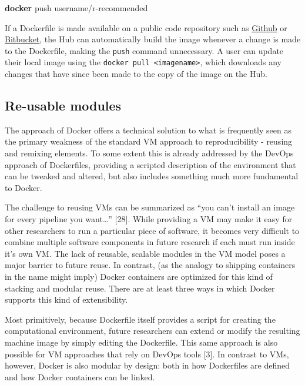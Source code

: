 \documentclass[9pt]{components/acm_proc_article-sp}
\newenvironment{Shaded}{\begin{snugshade}}{\end{snugshade}}
\newcommand{\KeywordTok}[1]{\textcolor[rgb]{0.13,0.29,0.53}{\textbf{{#1}}}}
\newcommand{\NormalTok}[1]{{#1}}
\begin{document}
\begin{Shaded}
\begin{Highlighting}[]
\KeywordTok{docker} \NormalTok{push username/r-recommended}
\end{Highlighting}
\end{Shaded}

If a Dockerfile is made available on a public code repository such as
\href{https://github.com}{Github} or
\href{https://bitbucket.org}{Bitbucket}, the Hub can automatically build
the image whenever a change is made to the Dockerfile, making the
\texttt{push} command unnecessary. A user can update their local image
using the \texttt{docker pull \textless{}imagename\textgreater{}}, which
downloads any changes that have since been made to the copy of the image
on the Hub.

\subsection{Re-usable modules}\label{re-usable-modules}

The approach of Docker offers a technical solution to what is frequently
seen as the primary weakness of the standard VM approach to
reproducibility - reusing and remixing elements. To some extent this is
already addressed by the DevOps approach of Dockerfiles, providing a
scripted description of the environment that can be tweaked and altered,
but also includes something much more fundamental to Docker.

The challenge to reusing VMs can be summarized as ``you can't install an
image for every pipeline you want\ldots{}'' {[}28{]}. While providing a
VM may make it easy for other researchers to run a particular piece of
software, it becomes very difficult to combine multiple software
components in future research if each must run inside it's own VM. The
lack of reusable, scalable modules in the VM model poses a major barrier
to future reuse. In contrast, (as the analogy to shipping containers in
the name might imply) Docker containers are optimized for this kind of
stacking and modular reuse. There are at least three ways in which
Docker supports this kind of extensibility.

Most primitively, because Dockerfile itself provides a script for
creating the computational environment, future researchers can extend or
modify the resulting machine image by simply editing the Dockerfile.
This same approach is also possible for VM approaches that rely on
DevOps tools {[}3{]}. In contrast to VMs, however, Docker is also
modular by design: both in how Dockerfiles are defined and how Docker
containers can be linked.
\end{document}
